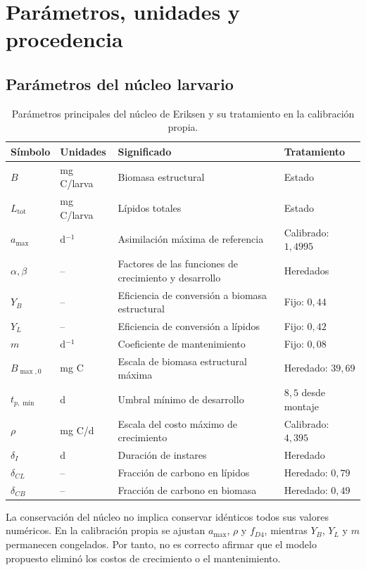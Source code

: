 \section{Parámetros, unidades y procedencia}

\subsection{Parámetros del núcleo larvario}

\begin{table}[H]
\centering
\small
\caption{Parámetros principales del núcleo de Eriksen y su tratamiento
en la calibración propia.}
\begin{tabularx}{\textwidth}{l l X l}
\toprule
Símbolo & Unidades & Significado & Tratamiento \\
\midrule
$B$ & mg C/larva & Biomasa estructural & Estado \\
$L_{\mathrm{tot}}$ & mg C/larva & Lípidos totales & Estado \\
$a_{\max}$ & d$^{-1}$ & Asimilación máxima de referencia &
Calibrado: $1{,}4995$ \\
$\alpha,\beta$ & -- & Factores de las funciones de crecimiento y
desarrollo & Heredados \\
$Y_B$ & -- & Eficiencia de conversión a biomasa estructural &
Fijo: $0{,}44$ \\
$Y_L$ & -- & Eficiencia de conversión a lípidos &
Fijo: $0{,}42$ \\
$m$ & d$^{-1}$ & Coeficiente de mantenimiento &
Fijo: $0{,}08$ \\
$B_{\max,0}$ & mg C & Escala de biomasa estructural máxima &
Heredado: $39{,}69$ \\
$t_{p,\min}$ & d & Umbral mínimo de desarrollo &
$8{,}5$ desde montaje \\
$\rho$ & mg C/d & Escala del costo máximo de crecimiento &
Calibrado: $4{,}395$ \\
$\delta_I$ & d & Duración de instares & Heredado \\
$\delta_{CL}$ & -- & Fracción de carbono en lípidos &
Heredado: $0{,}79$ \\
$\delta_{CB}$ & -- & Fracción de carbono en biomasa &
Heredado: $0{,}49$ \\
\bottomrule
\end{tabularx}
\end{table}

La conservación del núcleo no implica conservar idénticos todos sus
valores numéricos. En la calibración propia se ajustan $a_{\max}$,
$\rho$ y $f_{D4}$, mientras $Y_B$, $Y_L$ y $m$ permanecen congelados.
Por tanto, no es correcto afirmar que el modelo propuesto eliminó los
costos de crecimiento o el mantenimiento.

